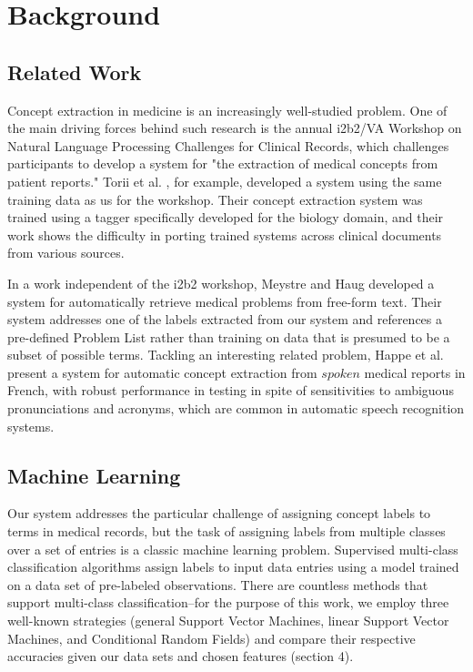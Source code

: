 \documentclass[preprint]{style}
\begin{document}
\section{Background}
\subsection{Related Work}
Concept extraction in medicine is an increasingly well-studied problem. One of the main driving forces behind such research is the annual i2b2/VA Workshop on Natural Language Processing Challenges for Clinical Records, which challenges participants to develop a system for "the extraction of medical concepts from patient reports." Torii et al. \cite{torii}, for example, developed a system using the same training data as us for the workshop. Their concept extraction system was trained using a tagger specifically developed for the biology domain, and their work shows the difficulty in porting trained systems across clinical documents from various sources. 

In a work independent of the i2b2 workshop, Meystre and Haug \cite{meystre} developed a system for automatically retrieve medical problems from free-form text. Their system addresses one of the labels extracted from our system and references a pre-defined Problem List rather than training on data that is presumed to be a subset of possible terms. Tackling an interesting related problem, Happe et al. \cite{heppe} present a system for automatic concept extraction from $spoken$ medical reports in French, with robust performance in testing in spite of sensitivities to ambiguous pronunciations and acronyms, which are common in automatic speech recognition systems. 

 

\subsection{Machine Learning}

Our system addresses the particular challenge of assigning concept labels to terms in medical records, but the task of assigning labels from multiple classes over a set of entries is a classic machine learning problem. Supervised multi-class classification algorithms assign labels to input data entries using a model trained on a data set of pre-labeled observations. There are countless methods that support multi-class classification--for the purpose of this work, we employ three well-known strategies (general Support Vector Machines, linear Support Vector Machines, and Conditional Random Fields) and compare their respective accuracies given our data sets and chosen features (section 4).
\end{document}
